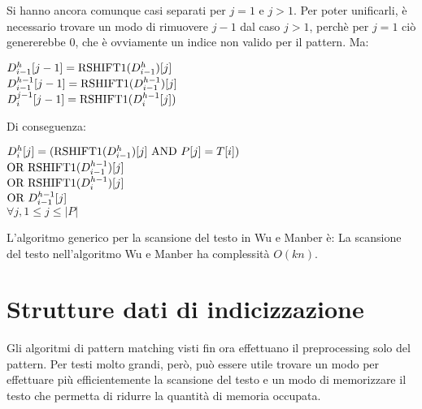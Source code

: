 Si hanno ancora comunque casi separati per $j = 1$ e $j > 1$.
Per poter unificarli, è necessario trovare un modo di rimuovere $j-1$ dal caso $j>1$, perchè per $j = 1$ ciò genererebbe 0, che è ovviamente un indice non valido per il pattern.
Ma:
\begin{center}
    $D_{i-1}^h[j-1] = \textnormal{RSHIFT1}(D_{i-1}^h)[j]$\\
    $D_{i-1}^{h-1}[j-1] = \textnormal{RSHIFT1}(D_{i-1}^{h-1})[j]$\\
    $D_i^{j-1}[j-1] = \textnormal{RSHIFT1}(D_i^{h-1}[j])$
\end{center}
Di conseguenza:
\begin{center}
    $D_i^h[j] = (\textnormal{RSHIFT1}(D_{i-1}^h)[j] \textnormal{ AND } P[j] = T[i])$\\
    $\textnormal{OR } \textnormal{RSHIFT1}(D_{i-1}^{h-1})[j]$\\
    $\textnormal{OR } \textnormal{RSHIFT1}(D_i^{h-1})[j]$\\
    $\textnormal{OR } D_{i-1}^{h-1}[j]$\\
    $\forall j, 1 \le j \le |P|$
\end{center}
L'algoritmo generico per la scansione del testo in Wu e Manber è:
La scansione del testo nell'algoritmo Wu e Manber ha complessità $O(kn)$.


\section{Strutture dati di indicizzazione}
Gli algoritmi di pattern matching visti fin ora effettuano il preprocessing solo del pattern.
Per testi molto grandi, però, può essere utile trovare un modo per effettuare più efficientemente la scansione del testo e un modo di memorizzare il testo che permetta di ridurre la quantità di memoria occupata.

